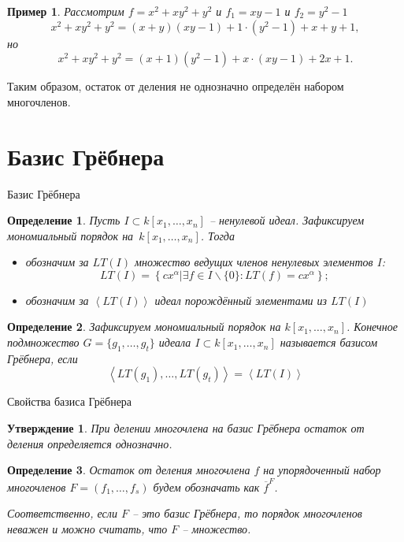 \documentclass[notheorems,aspectratio=169]{beamer}
\newtheorem{example}{Пример}
\newtheorem{definition}{Определение}
\newtheorem{statement}{Утверждение}
\begin{document}
\begin{frame}
    \begin{example}
    Рассмотрим $f = x^2 + xy^2 + y^2$ и $f_1 = xy - 1$ и $f_2 = y^2 - 1$
    $$
        x^2 + xy^2 + y^2 = (x+y)(xy-1) + 1\cdot (y^2-1) + x + y + 1,
    $$
    но
    $$
        x^2 + xy^2 + y^2 = (x+1)(y^2-1) + x\cdot(xy-1)+2x+1.
    $$
    \end{example}
    
    Таким образом, остаток от деления не однозначно определён набором многочленов.
\end{frame}

\section{Базис Грёбнера}
\begin{frame} {Базис Грёбнера}
    \begin{definition}
        Пусть $I\subset k[x_1,\dots, x_n]$ -- ненулевой идеал. Зафиксируем мономиальный порядок на~$k[x_1,\dots, x_n]$. Тогда
        \begin{itemize}
            \item [(i)] обозначим за $LT(I)$ множество ведущих членов ненулевых элементов $I$:
                $$
                LT(I) = \left\{cx^\alpha | \exists f\in I\backslash\{0\} : LT(f) = cx^\alpha\right\};
                $$
            \item [(ii)] обозначим за $\left\langle LT(I) \right\rangle$ идеал порождённый элементами из $LT(I)$
        \end{itemize}
    \end{definition}
    \begin{definition}
    Зафиксируем мономиальный порядок на $k[x_1,\dots, x_n]$. Конечное подмножество $G=\{g_1,\dots, g_t\}$ идеала $I\subset k[x_1,\dots, x_n]$ называется базисом Грёбнера, если 
    $$
        \left\langle LT(g_1),\dots, LT(g_t)\right\rangle = \left\langle LT(I) \right\rangle
    $$
    \end{definition}
\end{frame}

\begin{frame}{Свойства базиса Грёбнера}
    \begin{statement}
          При делении многочлена на базис Грёбнера остаток от деления определяется однозначно.
    \end{statement}
    \begin{definition}
     Остаток от деления многочлена $f$ на упорядоченный набор многочленов $F = (f_1,\dots, f_s)$ будем обозначать как $\overline f^F$.
     
         Соответственно, если $F$ -- это базис Грёбнера, то порядок многочленов неважен и можно считать, что $F$ -- множество.
    \end{definition}
\end{frame}
\end{document}
